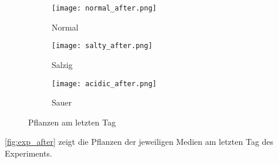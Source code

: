     \begin{figure}[h]
        \centering
        \begin{subfigure}{.32\textwidth}
            \texttt{[image: normal\_after.png]}
            \caption{Normal}
            \label{fig:normal_after}
        \end{subfigure}
        \begin{subfigure}{.32\textwidth}
            \texttt{[image: salty\_after.png]}
            \caption{Salzig}
            \label{fig:salty_after}
        \end{subfigure}
        \begin{subfigure}{.32\textwidth}
            \texttt{[image: acidic\_after.png]}
            \caption{Sauer}
            \label{fig:acidic_after}
        \end{subfigure}
        \caption{Pflanzen am letzten Tag}
        \label{fig:exp_after}
    \end{figure}
    \autoref{fig:exp_after} zeigt die Pflanzen der jeweiligen Medien am letzten Tag des Experiments.
